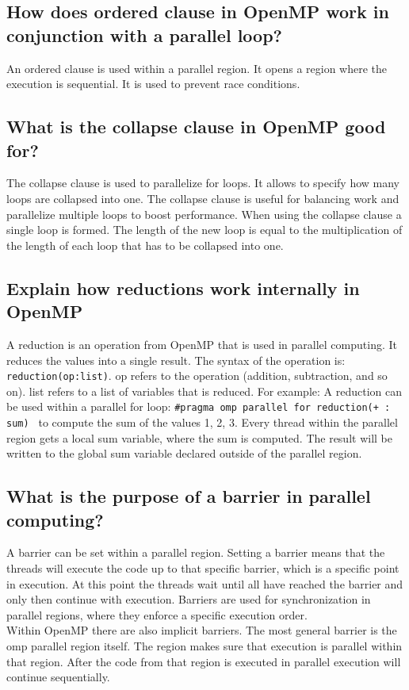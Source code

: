 \documentclass[runningheads]{llncs}
\begin{document}
\subsection{How does ordered clause in OpenMP work in conjunction with a parallel loop?}
An ordered clause is used within a parallel region. It opens a region where the execution is sequential. 
It is used to prevent race conditions.

\subsection{What is the collapse clause in OpenMP good for?}
The collapse clause is used to parallelize for loops. It allows to specify how many loops are collapsed into one. 
The collapse clause is useful for balancing work and parallelize multiple loops to boost performance.
When using the collapse clause a single loop is formed. The length of the new loop is equal to the multiplication 
of the length of each loop that has to be collapsed into one.

\subsection{Explain how reductions work internally in OpenMP}
A reduction is an operation from OpenMP that is used in parallel computing. 
It reduces the values into a single result.
The syntax of the operation is: \lstinline{reduction(op:list)}. 
op refers to the operation (addition, subtraction, and so on). 
list refers to a list of variables that is reduced.
For example: A reduction can be used within a parallel for loop: 
\lstinline{#pragma omp parallel for reduction(+ : sum) } to compute the sum of the values 1, 2, 3. 
Every thread within the parallel region gets a local sum variable, where the sum is computed. 
The result will be written to the global sum variable declared outside of the parallel region.

\subsection{What is the purpose of a barrier in parallel computing?}
A barrier can be set within a parallel region. 
Setting a barrier means that the threads will execute the code up to that specific barrier, which is a specific point in execution. 
At this point the threads wait until all have reached the barrier and only then continue with execution.
Barriers are used for synchronization in parallel regions, where they enforce a specific execution order. \\
Within OpenMP there are also implicit barriers. The most general barrier is the omp parallel region itself. 
The region makes sure that execution is parallel within that region. 
After the code from that region is executed in parallel execution will continue sequentially. 
\end{document}
